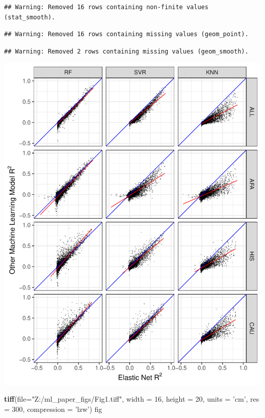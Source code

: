 \documentclass[]{article}
\newenvironment{Shaded}{\begin{snugshade}}{\end{snugshade}}
\newcommand{\KeywordTok}[1]{\textcolor[rgb]{0.13,0.29,0.53}{\textbf{#1}}}
\newcommand{\DataTypeTok}[1]{\textcolor[rgb]{0.13,0.29,0.53}{#1}}
\newcommand{\DecValTok}[1]{\textcolor[rgb]{0.00,0.00,0.81}{#1}}
\newcommand{\StringTok}[1]{\textcolor[rgb]{0.31,0.60,0.02}{#1}}
\newcommand{\NormalTok}[1]{#1}
\begin{document}
\begin{verbatim}
## Warning: Removed 16 rows containing non-finite values (stat_smooth).
\end{verbatim}

\begin{verbatim}
## Warning: Removed 16 rows containing missing values (geom_point).
\end{verbatim}

\begin{verbatim}
## Warning: Removed 2 rows containing missing values (geom_smooth).
\end{verbatim}

\includegraphics{Fig1_cvR2_files/figure-latex/unnamed-chunk-1-1.pdf}

\begin{Shaded}
\begin{Highlighting}[]
\KeywordTok{tiff}\NormalTok{(}\DataTypeTok{file=}\StringTok{"Z:/ml_paper_figs/Fig1.tiff"}\NormalTok{, }\DataTypeTok{width =} \DecValTok{16}\NormalTok{, }\DataTypeTok{height =} \DecValTok{20}\NormalTok{, }\DataTypeTok{units =} \StringTok{'cm'}\NormalTok{, }\DataTypeTok{res =} \DecValTok{300}\NormalTok{, }\DataTypeTok{compression =} \StringTok{'lzw'}\NormalTok{)}
\NormalTok{fig}
\end{Highlighting}
\end{Shaded}
\end{document}
